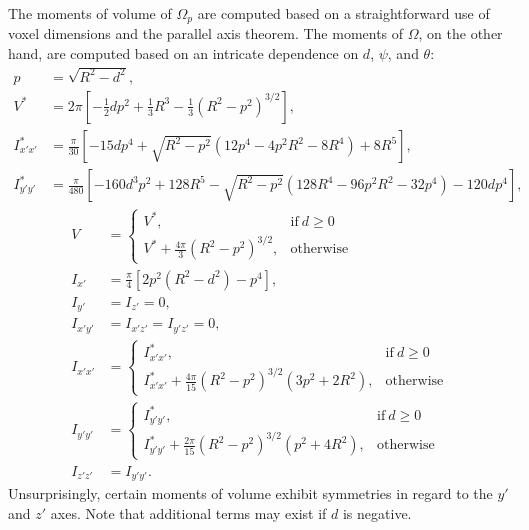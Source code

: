 The moments of volume of $\Omega_p$ are computed based on a straightforward use of voxel dimensions and the parallel axis theorem. The moments of $\Omega$, on the other hand, are computed based on an intricate dependence on $d$, $\psi$, and $\theta$:
\begin{align}
p &= \sqrt{R^2 - d^2}, \\
V^* &= 2\pi\left[-\frac{1}{2}dp^2 + \frac{1}{3}R^3 - \frac{1}{3}(R^2 - p^2)^{3/2} \right], \\
I^*_{x'x'} &= \frac{\pi}{30}\left[-15dp^4 + \sqrt{R^2-p^2}\left(12p^4 - 4p^2R^2 - 8R^4\right) + 8R^5 \right], \\
I^*_{y'y'} &= \frac{\pi}{480}\left[-160d^3p^2 + 128R^5 - \sqrt{R^2-p^2}\left(128R^4 - 96p^2R^2 - 32p^4\right) - 120dp^4 \right],
\end{align}
\begin{align} 
V &=  \begin{cases}
      V^*, & \text{if}\ d \geq 0 \\
      V^* + \frac{4\pi}{3}\left(R^2-p^2\right)^{3/2}, & \text{otherwise}
    \end{cases}\\
I_{x'} &= \frac{\pi}{4}\left[2p^2(R^2-d^2) - p^4 \right],\\
I_{y'} &= I_{z'} = 0, \\
I_{x'y'} &= I_{x'z'} = I_{y'z'} = 0, \\
I_{x'x'} &=  \begin{cases}
      I^*_{x'x'}, & \text{if}\ d \geq 0 \\
       I^*_{x'x'} + \frac{4\pi}{15}(R^2-p^2)^{3/2}(3p^2+2R^2), & \text{otherwise}
    \end{cases} \\
I_{y'y'} &=  \begin{cases}
     I^*_{y'y'}, & \text{if}\ d \geq 0 \\
     I^*_{y'y'} + \frac{2\pi}{15}(R^2-p^2)^{3/2}(p^2+4R^2), & \text{otherwise}
    \end{cases} \\
I_{z'z'} &= I_{y'y'}.
\end{align}
Unsurprisingly, certain moments of volume exhibit symmetries in regard to the $y'$ and $z'$ axes. Note that additional terms may exist if $d$ is negative.


